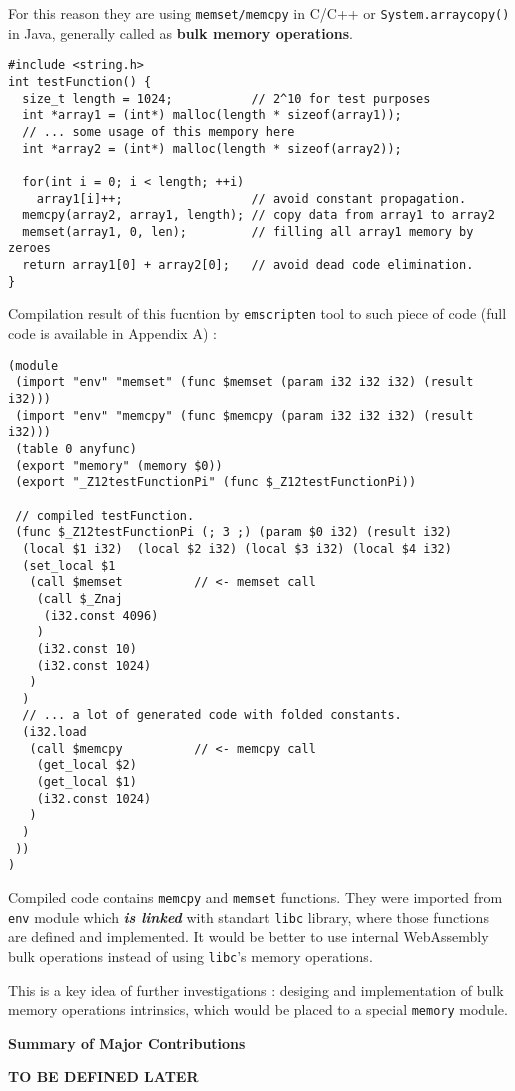 For this reason they are using \texttt{memset/memcpy} in C/C++ or \texttt{System.arraycopy()} in Java, generally called as \textbf{bulk memory operations}. 

\begin{verbatim}
#include <string.h>
int testFunction() {
  size_t length = 1024;           // 2^10 for test purposes 
  int *array1 = (int*) malloc(length * sizeof(array1));
  // ... some usage of this mempory here
  int *array2 = (int*) malloc(length * sizeof(array2));
  
  for(int i = 0; i < length; ++i)
    array1[i]++;                  // avoid constant propagation. 
  memcpy(array2, array1, length); // copy data from array1 to array2 
  memset(array1, 0, len);         // filling all array1 memory by zeroes 
  return array1[0] + array2[0];   // avoid dead code elimination.
}
\end{verbatim}

Compilation result of this fucntion by \texttt{emscripten} tool to such piece of code (full code is available in Appendix A) :
\small
\begin{verbatim}
(module
 (import "env" "memset" (func $memset (param i32 i32 i32) (result i32)))
 (import "env" "memcpy" (func $memcpy (param i32 i32 i32) (result i32)))
 (table 0 anyfunc)
 (export "memory" (memory $0))
 (export "_Z12testFunctionPi" (func $_Z12testFunctionPi))

 // compiled testFunction.
 (func $_Z12testFunctionPi (; 3 ;) (param $0 i32) (result i32)
  (local $1 i32)  (local $2 i32) (local $3 i32) (local $4 i32)
  (set_local $1
   (call $memset          // <- memset call
    (call $_Znaj
     (i32.const 4096)
    )
    (i32.const 10)
    (i32.const 1024)
   )
  )
  // ... a lot of generated code with folded constants.
  (i32.load
   (call $memcpy          // <- memcpy call
    (get_local $2)
    (get_local $1)
    (i32.const 1024)
   )
  )
 ))
)
\end{verbatim}
\normalsize
Compiled code contains \texttt{memcpy} and \texttt{memset} functions.
They were imported from \texttt{env} module which \textbf{\textit{is linked}} with standart \texttt{libc} library, where those functions are defined and implemented.
It would be better to use internal WebAssembly bulk operations instead of using \texttt{libc}'s memory operations. 

This is a key idea of further investigations : desiging and implementation of bulk memory operations intrinsics, which would be placed to a special \texttt{memory} module.

\Large \textbf{Summary of Major Contributions}
\normalsize

\textbf{TO BE DEFINED LATER}

